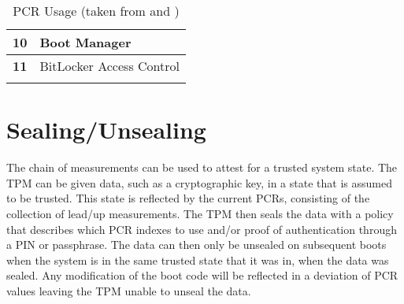 \begin{table}[htb]
\begin{tabularx}{1.0\textwidth}{cX}
        \midrule
        \textbf{10}                 & Boot Manager                                                                                             \\[\defaultaddspace]
        \midrule
        \textbf{11}                 & BitLocker Access Control                                                                                 \\
        \arrayrulecolor{black}
        \bottomrule
    \end{tabularx}%
    \caption{\ac{PCR} Usage (taken from \cite[Table 1]{tcg-pc-client-platform-firmware-profile-spec} and \cite[Table 9-2]{windows-internals-6-part2})}%
\end{table}


\section{Sealing/Unsealing}

The chain of measurements can be used to attest for a trusted system state.
The \ac{TPM} can be given data, such as a cryptographic key, in a state that is assumed to be trusted.
This state is reflected by the current \acp{PCR}, consisting of the collection of lead\-/up measurements.
The \ac{TPM} then seals the data with a policy that describes which \ac{PCR} indexes to use and/or proof of authentication through a \ac{PIN} or passphrase.
The data can then only be unsealed on subsequent boots when the system is in the same trusted state that it was in, when the data was sealed.
Any modification of the boot code will be reflected in a deviation of \ac{PCR} values leaving the \ac{TPM} unable to unseal the data.
